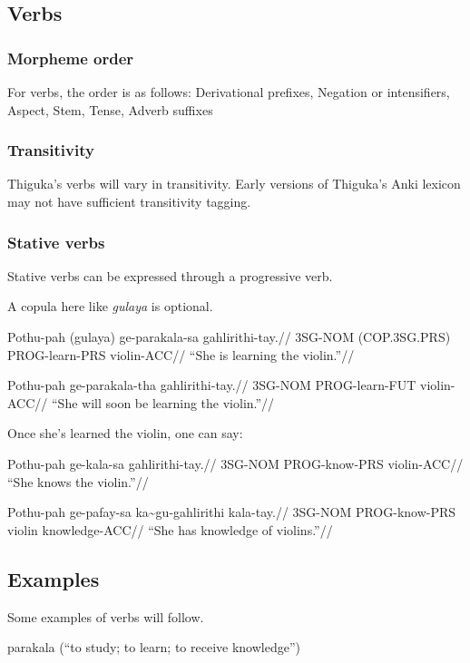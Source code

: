 \newpage{}

\subsection{Verbs}
\subsubsection{Morpheme order}
For verbs, the order is as follows: Derivational prefixes, Negation or intensifiers, Aspect, Stem, Tense, Adverb suffixes

\subsubsection{Transitivity}
Thiguka's verbs will vary in transitivity. Early versions of Thiguka's Anki lexicon may not have sufficient transitivity tagging.

\subsubsection{Stative verbs}
Stative verbs can be expressed through a progressive verb.

A copula here like \textit{gulaya} is optional.

\ex
\begingl
    \gla Pothu-pah (gulaya)      ge-parakala-sa gahlirithi-tay.//
    \glb 3SG-NOM   (COP.3SG.PRS) PROG-learn-PRS violin-ACC//
    \glft ``She is learning the violin.''//
\endgl
\xe

\ex
\begingl
    \gla Pothu-pah ge-parakala-tha gahlirithi-tay.//
    \glb 3SG-NOM   PROG-learn-FUT violin-ACC//
    \glft ``She will soon be learning the violin.''//
\endgl
\xe

Once she's learned the violin, one can say:

\ex
\begingl
    \gla Pothu-pah ge-kala-sa    gahlirithi-tay.//
    \glb 3SG-NOM   PROG-know-PRS violin-ACC//
    \glft ``She knows the violin.''//
\endgl
\xe

\ex
\begingl
    \gla Pothu-pah ge-pafay-sa    ka\~{}gu-gahlirithi kala-tay.//
    \glb 3SG-NOM   PROG-know-PRS \agradj{}violin knowledge-ACC//
    \glft ``She has knowledge of violins.''//
\endgl
\xe


\subsection{Examples}
Some examples of verbs will follow.

parakala (``to study; to learn; to receive knowledge'')

